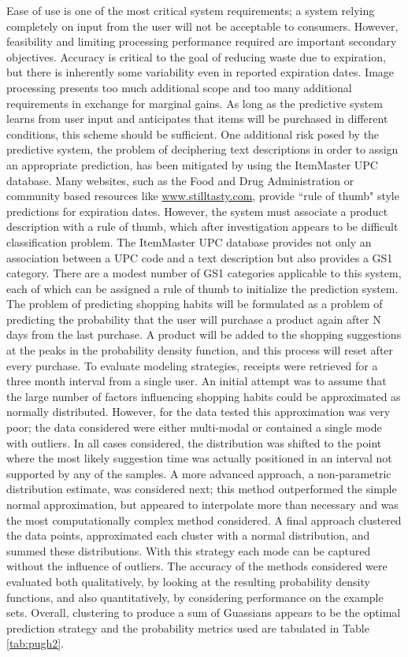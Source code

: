 \documentclass[11pt]{article} %
\begin{document}
Ease of use is one of the most critical system requirements; a system relying completely on input from the user will not be acceptable to consumers. However, feasibility and limiting processing performance required are important secondary objectives. Accuracy is critical to the goal of reducing waste due to expiration, but there is inherently some variability even in reported expiration dates. Image processing presents too much additional scope and too many additional requirements in exchange for marginal gains. As long as the predictive system learns from user input and anticipates that items will be purchased in different conditions, this scheme should be sufficient. One additional risk posed by the predictive system, the problem of deciphering text descriptions in order to assign an appropriate prediction, has been mitigated by using the ItemMaster UPC database. Many websites, such as the Food and Drug Administration or community based resources like \url{www.stilltasty.com}, provide ``rule of thumb" style predictions for expiration dates. However, the system must associate a product description with a rule of thumb, which after investigation appears to be difficult classification problem. The ItemMaster UPC database provides not only an association between a UPC code and a text description but also provides a GS1 category. There are a modest number of GS1 categories applicable to this system, each of which can be assigned a rule of thumb to initialize the prediction system.
\newline \quad \newline
The problem of predicting shopping habits will be formulated as a problem of predicting the probability that the user will purchase a product again after N days from the last purchase. A product will be added to the shopping suggestions at the peaks in the probability density function, and this process will reset after every purchase. To evaluate modeling strategies, receipts were retrieved for a three month interval from a single user. An initial attempt was to assume that the large number of factors influencing shopping habits could be approximated as normally distributed. However, for the data tested this approximation was very poor; the data considered were either multi-modal or contained a single mode with outliers. In all cases considered, the distribution was shifted to the point where the most likely suggestion time was actually positioned in an interval not supported by any of the samples. A more advanced approach, a non-parametric distribution estimate, was considered next; this method outperformed the simple normal approximation, but appeared to interpolate more than necessary and was the most computationally complex method considered. A final approach clustered the data points, approximated each cluster with a normal distribution, and summed these distributions. With this strategy each mode can be captured without the influence of outliers. The accuracy of the methods considered were evaluated both qualitatively, by looking at the resulting probability density functions, and also quantitatively, by considering performance on the example sets. Overall, clustering to produce a sum of Guassians appears to be the optimal prediction strategy and the probability metrics used are tabulated in Table \ref{tab:pugh2}. 
\end{document}
